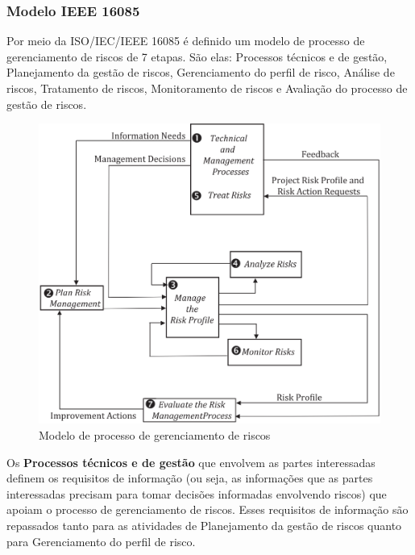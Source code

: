 \documentclass[
	12pt,
	openright,
	twoside,
	a4paper,
	english,
	brazil
	]{abntex2}
\begin{document}

\subsubsection{Modelo IEEE 16085}

Por meio da ISO/IEC/IEEE 16085 é definido um modelo de processo de gerenciamento de riscos de 7 etapas. São elas: Processos técnicos e de gestão, Planejamento da gestão de riscos, Gerenciamento do perfil de risco, Análise de riscos, Tratamento de riscos, Monitoramento de riscos e Avaliação do processo de gestão de riscos.

\begin{figure}[H]
	\caption{\label{modelo-processo-gerenciamento-riscos}Modelo de processo de gerenciamento de riscos}
  \includegraphics[width=\textwidth]{modelo-processo-gerenciamento-riscos}
\end{figure}

Os \textbf{Processos técnicos e de gestão} que envolvem as partes interessadas definem os requisitos de informação (ou seja, as informações que as partes interessadas precisam para tomar decisões informadas envolvendo riscos) que apoiam o processo de gerenciamento de riscos. Esses requisitos de informação são repassados tanto para as atividades de Planejamento da gestão de riscos quanto para Gerenciamento do perfil de risco.
\end{document}
